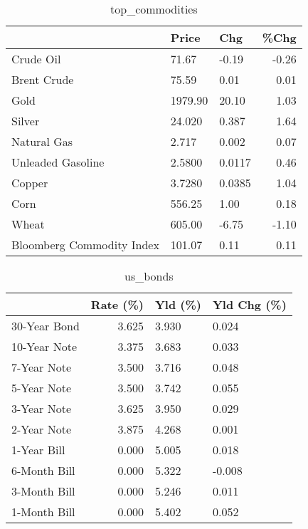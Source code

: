 \documentclass{article}%
\begin{document}
\begin{table}[htbp]%
\caption{top\_commodities}%
\centering%
\begin{adjustbox}{width=1\textwidth}%
\begin{tabular}{lllr}
\toprule
                          &   Price &    Chg &  \%Chg \\
\midrule
               Crude Oil  &   71.67 &  -0.19 & -0.26 \\
             Brent Crude  &   75.59 &   0.01 &  0.01 \\
                    Gold  & 1979.90 &  20.10 &  1.03 \\
                  Silver  &  24.020 &  0.387 &  1.64 \\
             Natural Gas  &   2.717 &  0.002 &  0.07 \\
       Unleaded Gasoline  &  2.5800 & 0.0117 &  0.46 \\
                  Copper  &  3.7280 & 0.0385 &  1.04 \\
                    Corn  &  556.25 &   1.00 &  0.18 \\
                   Wheat  &  605.00 &  -6.75 & -1.10 \\
Bloomberg Commodity Index &  101.07 &   0.11 &  0.11 \\
\bottomrule
\end{tabular}
%
\end{adjustbox}%
\end{table}

%


\begin{table}[htbp]%
\caption{us\_bonds}%
\centering%
\begin{adjustbox}{width=1\textwidth}%
\begin{tabular}{lrll}
\toprule
             &  Rate (\%) & Yld (\%) & Yld Chg (\%) \\
\midrule
30-Year Bond &     3.625 &   3.930 &       0.024 \\
10-Year Note &     3.375 &   3.683 &       0.033 \\
 7-Year Note &     3.500 &   3.716 &       0.048 \\
 5-Year Note &     3.500 &   3.742 &       0.055 \\
 3-Year Note &     3.625 &   3.950 &       0.029 \\
 2-Year Note &     3.875 &   4.268 &       0.001 \\
 1-Year Bill &     0.000 &   5.005 &       0.018 \\
6-Month Bill &     0.000 &   5.322 &      -0.008 \\
3-Month Bill &     0.000 &   5.246 &       0.011 \\
1-Month Bill &     0.000 &   5.402 &       0.052 \\
\bottomrule
\end{tabular}
%
\end{adjustbox}%
\end{table}
\end{document}
